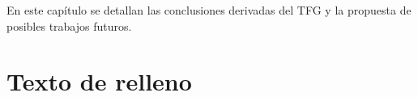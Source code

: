 En este capítulo se detallan las conclusiones derivadas del TFG y la propuesta de posibles trabajos futuros.

\section{Texto de relleno}

\lipsum[1-18]